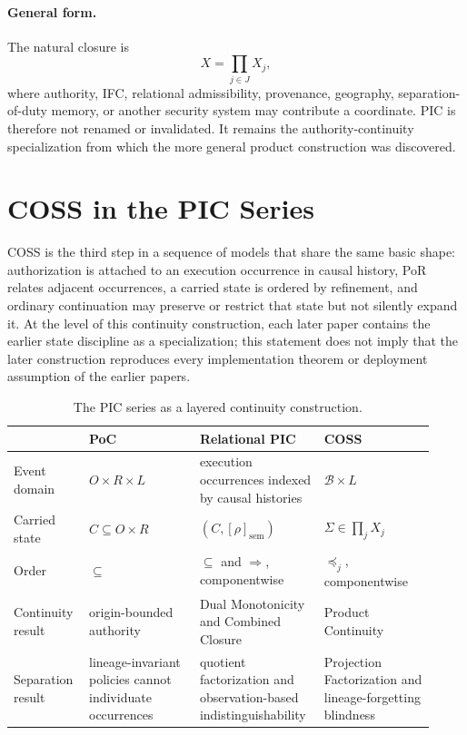 \documentclass[10pt,twocolumn]{article}
\newcommand{\Model}{\textnormal{\textsc{COSS}}\xspace}
\newcommand{\state}{\Sigma}
\begin{document}
\paragraph{General form.}
The natural closure is
\begin{equation}
  X=\prod_{j\in J}X_j,
\end{equation}
where authority, IFC, relational admissibility, provenance, geography,
separation-of-duty memory, or another security system may contribute a
coordinate.  PIC is therefore not renamed or invalidated.  It remains the
authority-continuity specialization from which the more general product
construction was discovered.

\section{COSS in the PIC Series}
\label{sec:series}

\Model is the third step in a sequence of models that share the same basic
shape: authorization is attached to an execution occurrence in causal history,
PoR relates adjacent occurrences, a carried state is ordered by refinement, and
ordinary continuation may preserve or restrict that state but not silently
expand it.  At the level of this continuity construction, each later paper
contains the earlier state discipline as a specialization; this statement does
not imply that the later construction reproduces every implementation theorem
or deployment assumption of the earlier papers.

\begin{table}[t]
\centering
\small
\begin{tabular}{@{}p{0.15\linewidth}p{0.255\linewidth}p{0.255\linewidth}p{0.255\linewidth}@{}}
\toprule
 & PoC \cite{gallo_poc2026} & Relational PIC \cite{gallo_relational2026} & \Model \\
\midrule
Event domain & $O\times R\times L$ & execution occurrences indexed by causal histories & $\mathcal{B}\times L$ \\
Carried state & $C\subseteq O\times R$ & $(C,[\rho]_{\mathrm{sem}})$ & $\state\in\prod_j X_j$ \\
Order & $\subseteq$ & $\subseteq$ and $\Rightarrow$, componentwise & $\preceq_j$, componentwise \\
Continuity result & origin-bounded authority & Dual Monotonicity and Combined Closure & Product Continuity \\
Separation result & lineage-invariant policies cannot individuate occurrences & quotient factorization and observation-based indistinguishability & Projection Factorization and lineage-forgetting blindness \\
\bottomrule
\end{tabular}
\caption{The PIC series as a layered continuity construction.}
\label{tab:series}
\end{table}
\end{document}
